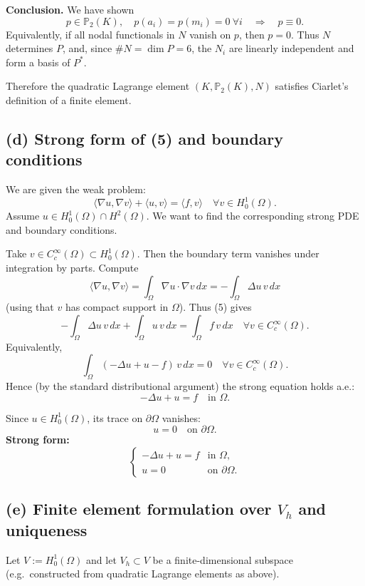 \textbf{Conclusion.}
We have shown
\[
    p\in\mathbb{P}_2(K),\quad p(a_i)=p(m_i)=0\ \forall i \quad\Rightarrow\quad p\equiv 0.
\]
Equivalently, if all nodal functionals in \(N\) vanish on \(p\), then \(p=0\).
Thus \(N\) determines \(P\), and, since \(\#N = \dim P = 6\), the \(N_i\) are linearly
independent and form a basis of \(P^\ast\).

Therefore the quadratic Lagrange element \((K,\mathbb{P}_2(K),N)\) satisfies Ciarlet's
definition of a finite element.

\subsection*{(d) Strong form of (5) and boundary conditions}
We are given the weak problem:
\[
    \langle \nabla u,\nabla v\rangle + \langle u,v\rangle
    = \langle f,v\rangle
    \quad\forall v\in H^1_0(\Omega). \tag{5}
\]
Assume \(u\in H^1_0(\Omega)\cap H^2(\Omega)\). We want to find the corresponding strong PDE
and boundary conditions.

Take \(v\in C_c^\infty(\Omega)\subset H^1_0(\Omega)\). Then the boundary term vanishes
under integration by parts. Compute
\[
    \langle \nabla u,\nabla v\rangle
    = \int_\Omega \nabla u\cdot\nabla v\,dx
    = -\int_\Omega \Delta u\,v\,dx
\]
(using that \(v\) has compact support in \(\Omega\)). Thus (5) gives
\[
    -\int_\Omega \Delta u\,v\,dx + \int_\Omega u\,v\,dx
    = \int_\Omega f\,v\,dx
    \quad\forall v\in C_c^\infty(\Omega).
\]
Equivalently,
\[
    \int_\Omega (-\Delta u + u - f)\,v\,dx = 0
    \quad\forall v\in C_c^\infty(\Omega).
\]
Hence (by the standard distributional argument) the strong equation holds a.e.:
\[
    -\Delta u + u = f \quad\text{in }\Omega.
\]

Since \(u\in H^1_0(\Omega)\), its trace on \(\partial\Omega\) vanishes:
\[
    u = 0 \quad\text{on }\partial\Omega.
\]
\textbf{Strong form:}
\[
    \boxed{
        \begin{cases}
            -\Delta u + u = f & \text{in }\Omega,         \\
            u = 0             & \text{on }\partial\Omega.
        \end{cases}
    }
\]

\subsection*{(e) Finite element formulation over $V_h$ and uniqueness}

Let \(V := H^1_0(\Omega)\) and let \(V_h\subset V\) be a finite-dimensional subspace
(e.g.\ constructed from quadratic Lagrange elements as above).

